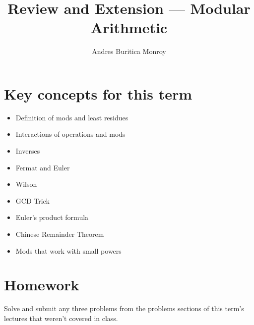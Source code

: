 \documentclass{article}
\title{Review and Extension --- Modular Arithmetic}
\author{Andres Buritica Monroy}
\date{}
\begin{document}
\maketitle
\section{Key concepts for this term}
  \begin{itemize}
    \item Definition of mods and least residues
    \item Interactions of operations and mods
    \item Inverses
    \item Fermat and Euler
    \item Wilson
    \item GCD Trick
    \item Euler's product formula
    \item Chinese Remainder Theorem
    \item Mods that work with small powers
  \end{itemize}
\section{Homework}
Solve and submit any three problems from the problems sections of this term's
lectures that weren't covered in class.
\end{document}
